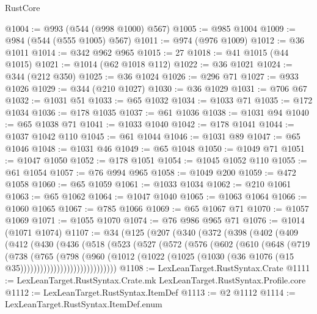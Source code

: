 \begin{lexlean}{RustCore}
\begin{coremodule}
@1004 := @993 (@544 (@998 @1000) @567)
@1005 := @985 @1004
@1009 := @984 (@544 (@555 @1005) @567)
@1011 := @974 (@976 @1009)
@1012 := @36 @1011
@1014 := @342 @962 @965
@1015 := 27
@1018 := @41 @1015 (@44 @1015)
@1021 := @1014 (@62 @1018 @112)
@1022 := @36 @1021
@1024 := @344 (@212 @350)
@1025 := @36 @1024
@1026 := @296 @71
@1027 := @933 @1026
@1029 := @344 (@210 @1027)
@1030 := @36 @1029
@1031 := @706 @67
@1032 := @1031 @51
@1033 := @65 @1032
@1034 := @1033 @71
@1035 := @172 @1034
@1036 := @178 @1035
@1037 := @61 @1036
@1038 := @1031 @94
@1040 := @65 @1038 @71
@1041 := @1033 @1040
@1042 := @178 @1041
@1044 := @1037 @1042 @110
@1045 := @61 @1044
@1046 := @1031 @89
@1047 := @65 @1046
@1048 := @1031 @46
@1049 := @65 @1048
@1050 := @1049 @71
@1051 := @1047 @1050
@1052 := @178 @1051
@1054 := @1045 @1052 @110
@1055 := @61 @1054
@1057 := @76 @994 @965
@1058 := @1049 @200
@1059 := @472 @1058
@1060 := @65 @1059
@1061 := @1033 @1034
@1062 := @210 @1061
@1063 := @65 @1062
@1064 := @1047 @1040
@1065 := @1063 @1064
@1066 := @1060 @1065
@1067 := @785 @1066
@1069 := @65 @1067 @71
@1070 := @1057 @1069
@1071 := @1055 @1070
@1074 := @76 @986 @965 @71
@1076 := @1014 (@1071 @1074)
@1107 := @34
    (@125
      (@207
        (@340
          (@372
            (@398
              (@402
                (@409
                  (@412
                    (@430
                      (@436
                        (@518
                          (@523
                            (@527
                              (@572
                                (@576
                                  (@602
                                    (@610
                                      (@648
                                        (@719
                                          (@738
                                            (@765
                                              (@798
                                                (@960
                                                  (@1012
                                                    (@1022
                                                      (@1025
                                                        (@1030
                                                          (@36
                                                            @1076
                                                            (@15 @35)))))))))))))))))))))))))))))
@1108 := LexLeanTarget.RustSyntax.Crate
@1111 := LexLeanTarget.RustSyntax.Crate.mk LexLeanTarget.RustSyntax.Profile.core
@1112 := LexLeanTarget.RustSyntax.ItemDef
@1113 := @2 @1112
@1114 := LexLeanTarget.RustSyntax.ItemDef.enum

\end{coremodule}
\end{lexlean}
